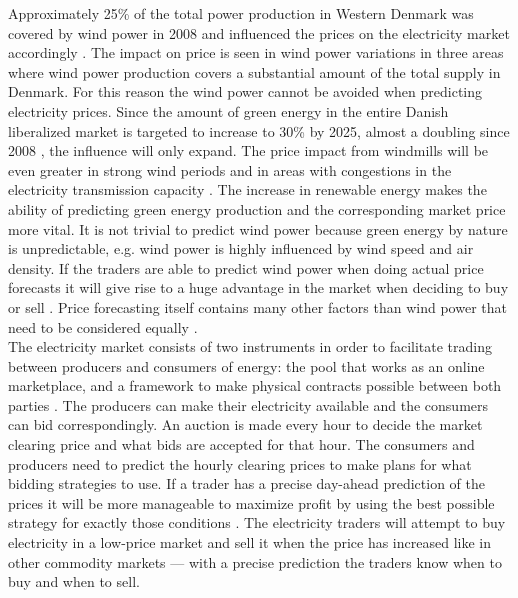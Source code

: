 Approximately 25\% of the total power production in Western Denmark was covered by wind power in 2008 and influenced the prices on the electricity market accordingly \cite{windPowerDanishLiberalized}. The impact on price is seen in wind power variations in three areas where wind power production covers a substantial amount of the total supply in Denmark. For this reason the wind power cannot be avoided when predicting electricity prices\cite{dayAheadImpactOfWindPowerForecasts}. Since the amount of green energy in the entire Danish liberalized market is targeted to increase to 30\% by 2025, almost a doubling since 2008 \cite{windPowerDanishLiberalized}, the influence will only expand. The price impact from windmills will be even greater in strong wind periods and in areas with congestions in the electricity transmission capacity \cite{windPowerDanishLiberalized}. The increase in renewable energy makes the ability of predicting green energy production and the corresponding market price more vital. It is not trivial to predict wind power because green energy by nature is unpredictable, e.g. wind power is highly influenced by wind speed and air density. If the traders are able to predict wind power when doing actual price forecasts it will give rise to a huge advantage in the market when deciding to buy or sell \cite{dayAheadImpactOfWindPowerForecasts}. Price forecasting itself contains many other factors than wind power that need to be considered equally \cite{21}.
\\[0.5cm]
The electricity market consists of two instruments in order to facilitate trading between producers and consumers of energy: the pool that works as an online marketplace, and a framework to make physical contracts possible between both parties \cite{21}. The producers can make their electricity available and the consumers can bid correspondingly. An auction is made every hour to decide the market clearing price and what bids are accepted for that hour. The consumers and producers need to predict the hourly clearing prices to make plans for what bidding strategies to use. If a trader has a precise day-ahead prediction of the prices it will be more manageable to maximize profit by using the best possible strategy for exactly those conditions \cite{21}. The electricity traders will attempt to buy electricity in a low-price market and sell it when the price has increased like in other commodity markets --- with a precise prediction the traders know when to buy and when to sell. 

